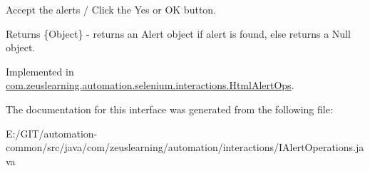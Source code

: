 Accept the alerts / Click the {\ttfamily Yes} or {\ttfamily OK} button.

\begin{DoxyReturn}{Returns}
\{Object\} -\/ returns an {\ttfamily Alert} object if alert is found, else returns a {\ttfamily Null} object. 
\end{DoxyReturn}


Implemented in \hyperlink{classcom_1_1zeuslearning_1_1automation_1_1selenium_1_1interactions_1_1HtmlAlertOps_a60bf8794a0914518cf2c670b478fb6c6}{com.\+zeuslearning.\+automation.\+selenium.\+interactions.\+Html\+Alert\+Ops}.



The documentation for this interface was generated from the following file\+:\begin{DoxyCompactItemize}
\item 
E\+:/\+G\+I\+T/automation-\/common/src/java/com/zeuslearning/automation/interactions/I\+Alert\+Operations.\+java\end{DoxyCompactItemize}
